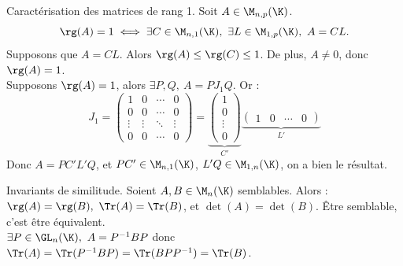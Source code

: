 \documentclass[11pt]{article}
\begin{document}
\begin{prop}{Caractérisation des matrices de rang 1.}{}
    Soit $A\in\M_{n,p}(\K)$.
    \begin{equation*}
        \rg(A)=1 \iff \exists C \in \M_{n,1}(\K), ~ \exists L \in \M_{1,p}(\K), ~ A=CL.
    \end{equation*}
    \tcblower
    \boxed{\la} Supposons que $A=CL$. Alors $\rg(A)\leq \rg(C)\leq 1$. De plus, $A\neq0$, donc $\rg(A)=1$.\\
    \boxed{\ra} Supposons $\rg(A)=1$, alors $\exists P,Q, ~ A = PJ_1Q$. Or :
    \begin{equation*}
        J_1=\begin{pmatrix}
            1 & 0 & \cdots & 0\\
            0 & 0 & \cdots & 0\\
            \vdots & \vdots & \ddots & \vdots\\
            0 & 0 & \cdots & 0
        \end{pmatrix} = \underbrace{\begin{pmatrix}
            1\\
            0\\
            \vdots\\
            0
        \end{pmatrix}}_{C'}\underbrace{\begin{pmatrix}
            1 & 0 & \cdots & 0
        \end{pmatrix}}_{L'}
    \end{equation*}
    Donc $A=PC'L'Q$, et $PC'\in\M_{n,1}(\K)$, $L'Q\in\M_{1,n}(\K)$, on a bien le résultat. 
\end{prop}

\vspace*{-0.7cm}

\begin{prop}{Invariants de similitude.}{}
    Soient $A,B\in\M_n(\K)$ semblables. Alors : $\rg(A)=\rg(B), ~ \Tr(A)=\Tr(B)$, et $\det(A)=\det(B)$.
    \tcblower
     Être semblable, c'est être équivalent.\\
     $\exists P \in \GL_n(\K), ~ A=P^{-1}BP$ donc $\Tr(A)=\Tr(P^{-1}BP)=\Tr(BPP^{-1})=\Tr(B)$.
\end{prop}

\vspace*{-0.7cm}
\end{document}
